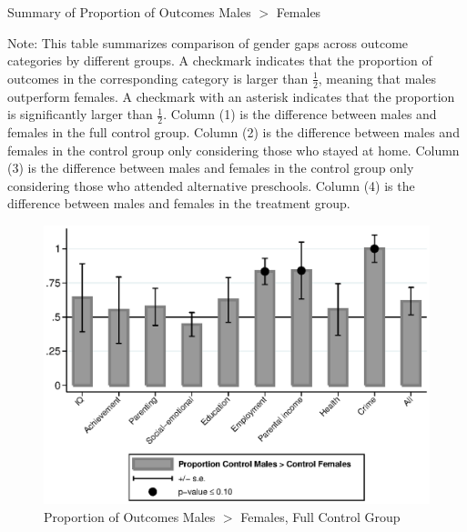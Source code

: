 \begin{table}[H]
\centering
\caption{Summary of Proportion of Outcomes Males $>$ Females}
\label{tab:proportion-table}
\begin{threeparttable}

\begin{tablenotes}
\footnotesize
\item Note: This table summarizes comparison of gender gaps across outcome categories by different groups. A checkmark indicates that the proportion of outcomes in the corresponding category is larger than $\frac{1}{2}$, meaning that males outperform females. A checkmark with an asterisk indicates that the proportion is significantly larger than $\frac{1}{2}$. Column (1) is the difference between males and females in the full control group.  Column (2) is the difference between males and females in the control group only considering those who stayed at home. Column (3) is the difference between males and females in the control group only considering those who attended alternative preschools. Column (4) is the difference between males and females in the treatment group.
\end{tablenotes}
\end{threeparttable}
\end{table}

\begin{figure}
\centering
\caption{Proportion of Outcomes Males $>$ Females, Full Control Group}\label{fig1}
\includegraphics[width=\textwidth]{output/gendergaps-fullcontrol}
\end{figure}

